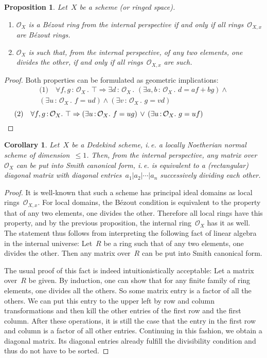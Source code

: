 \documentclass[10pt]{amsart}
\makeatletter
\theoremstyle{definition}
\theoremstyle{plain}
\newtheorem{prop}[defn]{Proposition}
\newtheorem{cor}[defn]{Corollary}
\theoremstyle{remark}
\renewcommand{\O}{\mathcal{O}}
\newcommand{\?}{\,{:}\,}
\renewcommand{\_}{\mathpunct{.}\,}
\newcommand{\ie}{i.\,e.\@\xspace}
\makeatother
\begin{document}
\begin{prop}Let~$X$ be a scheme (or ringed space).
\begin{enumerate}
\item $\O_X$ is a Bézout ring from the internal perspective if and only if all
rings~$\O_{X,x}$ are Bézout rings.
\item $\O_X$ is such that, from the internal perspective, of any two elements,
one divides the other, if and only if all rings~$\O_{X,x}$ are such.
\end{enumerate}
\end{prop}
\begin{proof}Both properties can be formulated as geometric implications:
\begin{multline*}
  \text{(1)}\quad
  \forall f,g\?\O_X\_
  \top \Rightarrow
  \exists d\?\O_X\_
  (\exists a,b\?\O_X\_ d = af + bg) \wedge {} \\
  (\exists u\?\O_X\_ f = ud) \wedge
  (\exists v\?\O_X\_ g = vd)
\end{multline*}
\[
  \text{(2)}\quad
  \forall f,g\?\O_X\_
  \top \Rightarrow
  (\exists u\?\O_X\_ f = ug) \,\vee\,
  (\exists u\?\O_X\_ g = uf) \qquad\qquad\qquad\quad \qedhere
\]
\end{proof}

\begin{cor}\label{cor:dedekind-smith}
Let~$X$ be a Dedekind scheme, \ie a locally Noetherian normal scheme
of dimension~$\leq 1$. Then, from the internal perspective, any matrix
over~$\O_X$ can be put into Smith canonical form, \ie is equivalent to a
(rectangular) diagonal matrix with diagonal entries~$a_1|a_2|\cdots|a_n$
successively dividing each other.
\end{cor}
\begin{proof}It is well-known that such a scheme has principal ideal domains as
local rings~$\O_{X,x}$. For local domains, the Bézout condition is equivalent to the
property that of any two elements, one divides the other. Therefore all local
rings have this property, and by the previous proposition, the internal
ring~$\O_X$ has it as well. The statement thus follows from interpreting the
following fact of linear algebra in the internal universe: Let~$R$ be a ring
such that of any two elements, one divides the other. Then any matrix over~$R$
can be put into Smith canonical form.

The usual proof of this fact is indeed intuitionistically acceptable: Let a
matrix over~$R$ be given. By induction, one can show that for any finite family
of ring elements, one divides all the others. So some matrix entry is a factor
of all the others. We can put this entry to the upper left by row and column
transformations and then kill the other entries of the first row and the first
column. After these operations, it is still the case that the entry in the
first row and column is a factor of all other entries. Continuing in this
fashion, we obtain a diagonal matrix. Its diagonal entries already fulfill
the divisibility condition and thus do not have to be sorted.
\end{proof}
\end{document}
